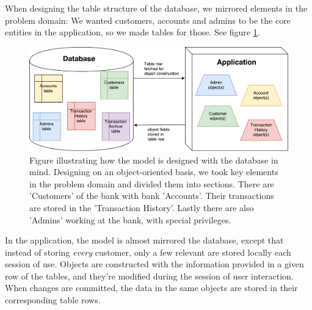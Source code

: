 When designing the table structure of the database, we mirrored elements in the problem domain: We wanted customers, accounts and admins to be the core entities in the application, so we made tables for those. See figure \ref{fig:wackyModelDesign}.
\begin{figure}[!htb]
    \centering
    \includegraphics[scale=.5]{figures/modelDesign.pdf}
    \caption{Figure illustrating how the model is designed with the database in mind. Designing on an object-oriented basis, we took key elements in the problem domain and divided them into sections. There are 'Customers' of the bank with  bank 'Accounts'. Their transactions are stored in the 
    'Transaction History'. Lastly there are also 'Admins' working at the bank, with special privileges.}
    \label{fig:wackyModelDesign}
\end{figure} 

In the application, the model is almost mirrored the database, except that instead of storing \textit{every} customer, only a few relevant are stored locally each session of use. Objects are constructed with the information provided in a given row of the tables, and they're modified during the session of user interaction. When changes are committed, the data in the same objects are stored in their corresponding table rows.